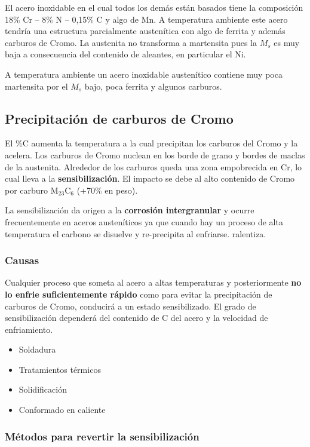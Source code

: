 El acero inoxidable en el cual todos los demás están basados tiene la composición 18\% Cr -- 8\% N -- 0,15\% C y algo de Mn. A temperatura ambiente este acero tendría una estructura parcialmente austenítica con algo de ferrita y además carburos de Cromo. La austenita no transforma a martensita pues la $M_s$ es muy baja a consecuencia del contenido de aleantes, en particular el Ni.

A temperatura ambiente un acero inoxidable austenítico contiene muy poca martensita por el $M_s$ bajo, poca ferrita y algunos carburos.

\subsection{Precipitación de carburos de Cromo}
El \%C aumenta la temperatura a la cual precipitan los carburos del Cromo y la acelera. Los carburos de Cromo nuclean en los borde de grano y bordes de maclas de la austenita. Alrededor de los carburos queda una zona empobrecida en Cr, lo cual lleva a la \textbf{sensibilización}. El impacto se debe al alto contenido de Cromo por carburo M$_{23}$C$_6$ (+70\% en peso).

La sensibilización da origen a la \textbf{corrosión intergranular} y ocurre frecuentemente en aceros austeníticos ya que cuando hay un proceso de alta temperatura el carbono se disuelve y re-precipita al enfriarse.
ralentiza. 

\subsubsection{Causas}
Cualquier proceso que someta al acero a altas temperaturas y posteriormente \textbf{no lo enfrie suficientemente rápido} como para evitar la precipitación de carburos de Cromo, conducirá a un estado sensibilizado. El grado de sensibilización dependerá del contenido de C del acero y la velocidad de enfriamiento.

\begin{itemize}
	\item Soldadura
	\item Tratamientos térmicos
	\item Solidificación
	\item Conformado en caliente
\end{itemize}

\subsubsection{Métodos para revertir la sensibilización}

